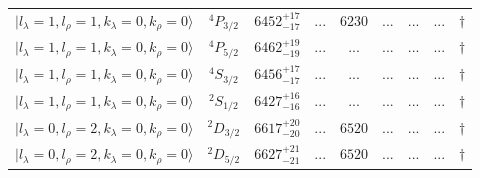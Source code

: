 \begin{tabular}{c c| c c c c c c c}
$\vert l_{\lambda}\!\!=\!1, l_{\rho}\!\!=\!1, k_{\lambda}\!\!=\!0, k_{\rho}\!\!=\!0 \rangle$ & $^{4}P_{3/2}$ & $6452^{+17}_{-17}$ & ... & $6230$ & ... & ... & ... & $\dagger$ \\ 
$\vert l_{\lambda}\!\!=\!1, l_{\rho}\!\!=\!1, k_{\lambda}\!\!=\!0, k_{\rho}\!\!=\!0 \rangle$ & $^{4}P_{5/2}$ & $6462^{+19}_{-19}$ & ... & ... & ... & ... & ... & $\dagger$ \\ 
$\vert l_{\lambda}\!\!=\!1, l_{\rho}\!\!=\!1, k_{\lambda}\!\!=\!0, k_{\rho}\!\!=\!0 \rangle$ & $^{4}S_{3/2}$ & $6456^{+17}_{-17}$ & ... & ... & ... & ... & ... & $\dagger$ \\ 
$\vert l_{\lambda}\!\!=\!1, l_{\rho}\!\!=\!1, k_{\lambda}\!\!=\!0, k_{\rho}\!\!=\!0 \rangle$ & $^{2}S_{1/2}$ & $6427^{+16}_{-16}$ & ... & ... & ... & ... & ... & $\dagger$ \\ 
$\vert l_{\lambda}\!\!=\!0, l_{\rho}\!\!=\!2, k_{\lambda}\!\!=\!0, k_{\rho}\!\!=\!0 \rangle$ & $^{2}D_{3/2}$ & $6617^{+20}_{-20}$ & ... & $6520$ & ... & ... & ... & $\dagger$ \\ 
$\vert l_{\lambda}\!\!=\!0, l_{\rho}\!\!=\!2, k_{\lambda}\!\!=\!0, k_{\rho}\!\!=\!0 \rangle$ & $^{2}D_{5/2}$ & $6627^{+21}_{-21}$ & ... & $6520$ & ... & ... & ... & $\dagger$ \\ 
\hline \hline
\end{tabular}
